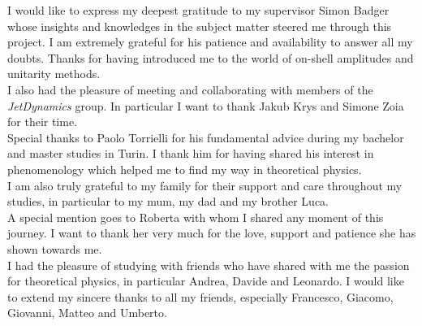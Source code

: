 \begin{acknowledgments}
I would like to express my deepest gratitude to my supervisor Simon Badger whose insights and knowledges in the subject matter steered me through this project. I am extremely grateful for his patience and availability to answer all my doubts. Thanks for having introduced me to the world of on-shell amplitudes and unitarity methods.\\
I also had the pleasure of meeting and collaborating with members of the \textit{JetDynamics} group. In particular I want to thank Jakub Krys and Simone Zoia for their time.\\
Special thanks to Paolo Torrielli for his fundamental advice during my bachelor and master studies in Turin. I thank him for having shared his interest in phenomenology which helped me to find my way in theoretical physics.\\
I am also truly grateful to my family for their support and care throughout my studies, in particular to my mum, my dad and my brother Luca.\\
A special mention goes to Roberta with whom I shared any moment of this journey. I want to thank her very much for the love, support and patience she has shown towards me.\\
I had the pleasure of studying with friends who have shared with me the passion for theoretical physics, in particular Andrea, Davide and Leonardo. I would like to extend my sincere thanks to all my friends, especially Francesco, Giacomo, Giovanni, Matteo and Umberto.
\end{acknowledgments}